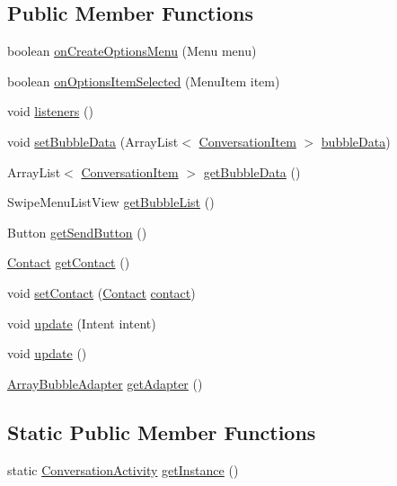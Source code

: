 \subsection*{Public Member Functions}
\begin{DoxyCompactItemize}
\item 
boolean \hyperlink{a00006_a8f7d87763ddaf085205a54e8477ecfce}{on\+Create\+Options\+Menu} (Menu menu)
\item 
boolean \hyperlink{a00006_a37a55c533c74b60c0290ef1329d74e65}{on\+Options\+Item\+Selected} (Menu\+Item item)
\item 
void \hyperlink{a00006_a92b8e0730130e1184a8cdbd89590779d}{listeners} ()
\item 
void \hyperlink{a00006_a1e3fee8580ec4092ffc6e3ce9d44f2b9}{set\+Bubble\+Data} (Array\+List$<$ \hyperlink{a00007}{Conversation\+Item} $>$ \hyperlink{a00006_a68544a0bda28776dfb51718a3c71bf69}{bubble\+Data})
\item 
Array\+List$<$ \hyperlink{a00007}{Conversation\+Item} $>$ \hyperlink{a00006_ac8e14177e6079becbb8bc1f8b35197e0}{get\+Bubble\+Data} ()
\item 
Swipe\+Menu\+List\+View \hyperlink{a00006_af293d3ea5f145650e06a96d2bae482da}{get\+Bubble\+List} ()
\item 
Button \hyperlink{a00006_a57576f3fc93bfa5a685ed5ee30fe113c}{get\+Send\+Button} ()
\item 
\hyperlink{a00005}{Contact} \hyperlink{a00006_adb647c7ae09f1d5755db63d701968925}{get\+Contact} ()
\item 
void \hyperlink{a00006_abef3c7b6635dc06ac6b8e4b37c51b37f}{set\+Contact} (\hyperlink{a00005}{Contact} \hyperlink{a00006_a3459849ab29ad684658dbcd0cf8c5d5a}{contact})
\item 
void \hyperlink{a00006_aa2825578f585a8a32958eaf0ce8df7b8}{update} (Intent intent)
\item 
void \hyperlink{a00006_ac5c54df7ed3b930268c8d7752c101725}{update} ()
\item 
\hyperlink{a00002}{Array\+Bubble\+Adapter} \hyperlink{a00006_a06738816ea7799569af8fa119bb49f7e}{get\+Adapter} ()
\end{DoxyCompactItemize}
\subsection*{Static Public Member Functions}
\begin{DoxyCompactItemize}
\item 
static \hyperlink{a00006}{Conversation\+Activity} \hyperlink{a00006_a7ebafa56e442a2f16c4afe044e65695b}{get\+Instance} ()
\end{DoxyCompactItemize}
